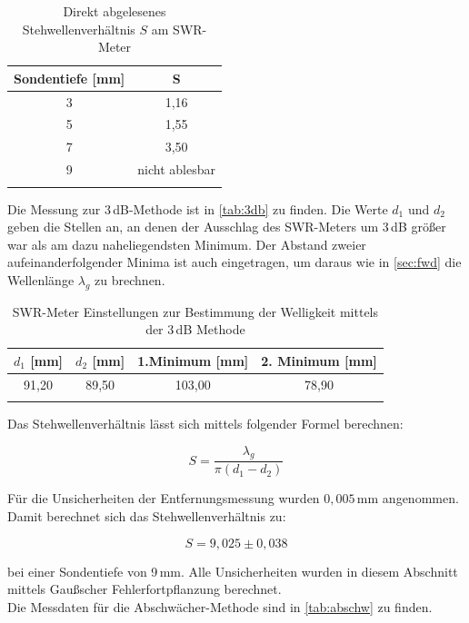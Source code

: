 \begin{table}
\centering
\caption{Direkt abgelesenes Stehwellenverhältnis $S$ am SWR-Meter}
\begin{tabular}{c c}
\toprule
{Sondentiefe [mm]} & {S}\\
\midrule
3&1,16\\
5&1,55\\
7&3,50\\
9&nicht ablesbar\\
\bottomrule
\label{tab:swr}
\end{tabular}
\end{table}


Die Messung zur 3\,dB-Methode ist in \autoref{tab:3db} zu finden. Die Werte $d_1$ und $d_2$ geben die Stellen an, an denen der Ausschlag des SWR-Meters um 3\,dB größer war als am dazu naheliegendsten Minimum. Der Abstand zweier aufeinanderfolgender Minima ist auch eingetragen, um daraus wie in \autoref{sec:fwd} die Wellenlänge $\lambda_g$ zu brechnen.



\begin{table}
\centering
\caption{SWR-Meter Einstellungen zur Bestimmung der Welligkeit mittels der 3\,dB Methode}
\begin{tabular}{c c c c}
\toprule
{$d_1$ [mm]} & {$d_2$ [mm]}& {1.Minimum [mm]}& {2. Minimum [mm]}\\
\midrule
91,20 & 89,50 & 103,00 & 78,90\\
\bottomrule
\label{tab:3db}
\end{tabular}
\end{table}

Das Stehwellenverhältnis lässt sich mittels folgender Formel berechnen:

\begin{equation}
S = \frac{\lambda_g}{\pi (d_1 - d_2)}
\label{eq:welligkeit1}
\end{equation}

Für die Unsicherheiten der Entfernungsmessung wurden $0,005$\,mm angenommen. Damit berechnet sich das Stehwellenverhältnis zu:

\begin{equation}
S = 9,025 \pm 0,038
\label{eq:welligkeit2}
\end{equation}

bei einer Sondentiefe von 9\,mm. Alle Unsicherheiten wurden in diesem Abschnitt mittels Gaußscher Fehlerfortpflanzung berechnet.\\
Die Messdaten für die Abschwächer-Methode sind in \autoref{tab:abschw} zu finden.


